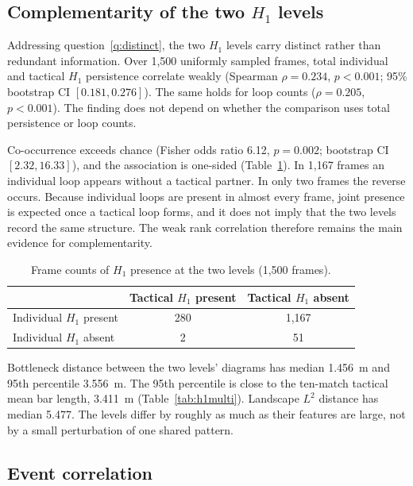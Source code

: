 \subsection{Complementarity of the two \texorpdfstring{$H_1$}{} levels}
\label{sec:complementarity}

Addressing question~\ref{q:distinct}, the two $H_1$ levels carry
distinct rather than redundant information.
Over 1{,}500 uniformly sampled frames, total individual and tactical
$H_1$ persistence correlate weakly (Spearman $\rho=0.234$, $p<0.001$;
95\% bootstrap CI $[0.181, 0.276]$). The same holds for loop counts
($\rho=0.205$, $p<0.001$). The finding does not depend on whether the
comparison uses total persistence or loop counts.

Co-occurrence exceeds chance (Fisher odds ratio 6.12, $p=0.002$;
bootstrap CI $[2.32, 16.33]$), and the association is one-sided
(Table~\ref{tab:fisher}). In 1{,}167 frames an individual loop appears
without a tactical partner. In only two frames the reverse occurs.
Because individual loops are present in almost every frame, joint
presence is expected once a tactical loop forms, and it does not imply
that the two levels record the same structure. The weak rank
correlation therefore remains the main evidence for complementarity.

\begin{table}[h]
\centering
\caption{Frame counts of \texorpdfstring{$H_1$}{} presence at the two levels (1{,}500 frames).}
\label{tab:fisher}
\begin{tabular}{@{}lcc@{}}
\toprule
 & Tactical $H_1$ present & Tactical $H_1$ absent \\
\midrule
Individual $H_1$ present & 280 & 1{,}167 \\
Individual $H_1$ absent  & 2   & 51 \\
\bottomrule
\end{tabular}
\end{table}

Bottleneck distance between the two levels'
diagrams has median 1.456~m and 95th percentile 3.556~m. The
95th percentile is close to the ten-match tactical mean bar length,
3.411~m (Table~\ref{tab:h1multi}). Landscape $L^2$ distance has median 5.477.
The levels differ by roughly as much as their features are large, not
by a small perturbation of one shared pattern.

\subsection{Event correlation}
\label{sec:eventcorr}

